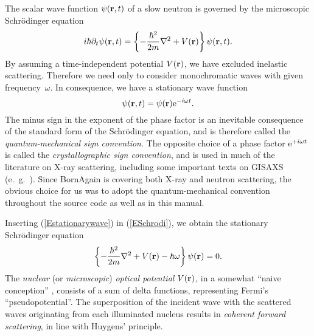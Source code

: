 The scalar wave function $\psi(\mathbf{r},t)$ of a slow neutron
is governed by the microscopic Schrödinger equation
\begin{equation}\label{ESchrodi}
  i\hbar\partial_t \psi(\mathbf{r},t)
  = \left\{-\frac{\hbar^2}{2m}\mathbf{\nabla}^2+V(\mathbf{r})\right\} \psi(\mathbf{r},t).
\end{equation}
By assuming a time-independent potential $V(\mathbf{r})$,
we have excluded inelastic scattering.
Therefore we need only to consider monochromatic waves
with given frequency~$\omega$.
In consequence, we have a stationary wave function
\begin{equation}\label{Estationarywave}
  \psi(\mathbf{r},t) = \psi(\mathbf{r}){\rm e}^{-i\omega t}.
\end{equation}
The minus sign in the exponent of the phase factor
is an inevitable consequence of the standard form of the Schrödinger equation,
and is therefore called the \textit{quantum-mechanical sign convention}.
The opposite choice of a phase factor ${\rm e}^{+i\omega t}$ is 
called the \textit{crystallographic sign convention},
and is used in much of the literature on X-ray scattering,
including some important texts on GISAXS (e.~g.\ \cite{ReLL09}).
Since BornAgain is covering both X-ray and neutron scattering,
the obvious choice for us was to adopt the quantum-mechanical convention
throughout the source code as well as in this manual.

Inserting (\ref{Estationarywave}) in (\ref{ESchrodi}),
we obtain the stationary Schrödinger equation
\begin{equation}\label{EstatSchrodi}
  \left\{-\frac{\hbar^2}{2m}\mathbf{\nabla}^2+V(\mathbf{r})-\hbar\omega\right\} \psi(\mathbf{r}) = 0.
\end{equation}
The \textit{nuclear} (or \textit{microscopic})
\textit{optical potential} $V(\mathbf{r})$,
in a somewhat ``naive conception'' \cite[p.~7]{Sea89},
consists of a sum of delta functions,
representing Fermi's ``pseudopotential''.
The superposition of the incident wave with the scattered waves
originating from each illuminated nucleus
results in \textit{coherent forward scattering},%
in line with Huygens' principle.%

